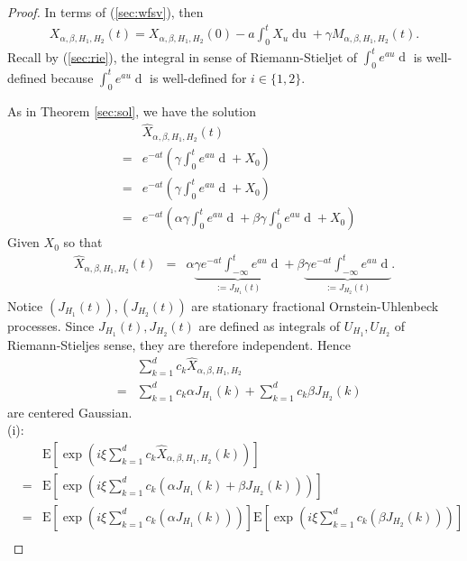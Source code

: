 \documentclass[a4paper, twoside, 11pt]{article}
\theoremstyle{definition}
\newcommand{\brkt}[1]{\left({#1} \right)}
\begin{document}
\begin{proof}
  In terms of (\ref{sec:wfsv}), then
  \begin{eqnarray*}
	X_{\alpha,\beta,H_1,H_2}(t) = X_{\alpha,\beta,H_1,H_2}(0) - a\int_0^t X_u \mathop{du} + \gamma M_{\alpha,\beta,H_1,H_2}(t).
\end{eqnarray*}
Recall by (\ref{sec:rie}), the integral in sense of Riemann-Stieljet of $\int_0^t e^{au} \mathop{dM_{\alpha,\beta,H_1,H_2}}$ is well-defined because $\int_0^t e^{au} \mathop{dU_{H_i}}$ is well-defined for $i\in\{1,2\}$.

As in Theorem \ref{sec:sol}, we have the solution
\begin{eqnarray*}
  && \hat{X}_{\alpha,\beta,H_1,H_2}(t)\\ 
  &=& e^{-at} \brkt{\gamma\int_0^t e^{au} \mathop{dM_{\alpha,\beta,H_1,H_2}} + X_0}\\
  &=&  e^{-at} \brkt{\gamma\int_0^t e^{au} \mathop{d(\alpha U_{H_1} + \beta U_{H_2})} + X_0}\\
  &=&  e^{-at} \brkt{\alpha \gamma\int_0^t e^{au} \mathop{d U_{H_1}} + \beta \gamma\int_0^t e^{au} \mathop{d U_{H_2}} + X_0}
\end{eqnarray*}
Given $X_0$ so that
\begin{eqnarray}
  \hat{X}_{\alpha,\beta,H_1,H_2}(t) &=&  \alpha \underbrace{\gamma e^{-at}\int_{-\infty}^t e^{au} \mathop{d U_{H_1}}}_{:=J_{H_1}(t)} + \beta\underbrace{ \gamma e^{-at}\int_{-\infty}^t e^{au} \mathop{d U_{H_2}}}_{:=J_{H_2}(t)}.
  \label{sec:jjj}
\end{eqnarray}
Notice $(J_{H_1}(t)), (J_{H_2}(t))$ are stationary fractional Ornstein-Uhlenbeck processes. Since $J_{H_1}(t), J_{H_2}(t)$ are defined as integrals of $U_{H_1}, U_{H_2}$ of Riemann-Stieljes sense, they are therefore independent.  Hence 
\begin{eqnarray*}
  && \sum\limits_{k=1}^{d} c_k \hat{X}_{\alpha,\beta,H_1,H_2}\\
  &=& \sum\limits_{k=1}^{d} c_k \alpha J_{H_1}(k) + \sum\limits_{k=1}^{d} c_k \beta J_{H_2}(k)
\end{eqnarray*}
are centered Gaussian.\\
 (i): 
 \begin{eqnarray*}
   &&\mathrm{E}[\exp(i\xi\sum\limits_{k=1}^{d} c_k \hat{X}_{\alpha,\beta,H_1,H_2}(k))]\\
   &=& \mathrm{E}[\exp(i\xi\sum\limits_{k=1}^{d} c_k (\alpha J_{H_1}(k) + \beta J_{H_2}(k)))]\\
   &=& \mathrm{E}[\exp(i\xi\sum\limits_{k=1}^{d} c_k (\alpha J_{H_1}(k)))]\mathrm{E}[\exp(i\xi\sum\limits_{k=1}^{d} c_k (\beta J_{H_2}(k)))] \\

\end{eqnarray*}
\end{proof}
\end{document}
